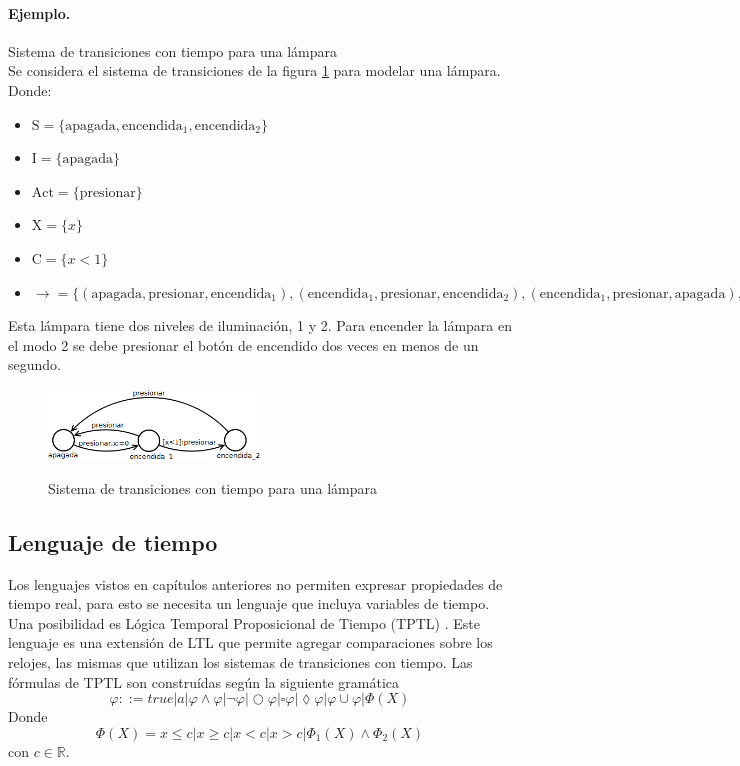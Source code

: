\paragraph{Ejemplo.} Sistema de transiciones con tiempo para una lámpara\\
Se considera el sistema de transiciones de la figura \ref{fig:lampara} para modelar una
 lámpara. Donde:
\begin{itemize}
\item $\text{S} = \{ \text{apagada}, \text{encendida}_1, \text{encendida}_2 \}$
\item $\text{I} = \{ \text{apagada} \}$
\item $\text{Act} = \{ \text{presionar} \}$
\item $\text{X} = \{ x \}$ 
\item $\text{C} = \{ x < 1 \}$
\item ${\to} = \{ (\text{apagada},\text{presionar},\text{encendida}_1), (\text{encendida}_1,\text{presionar},\text{encendida}_2), (\text{encendida}_1,\text{presionar},\text{apagada}), (\text{encendida}_2,\text{presionar},\text{apagada}) \}$
\end{itemize}

Esta lámpara tiene dos niveles de iluminación, 1 y 2. Para encender la lámpara en el
 modo 2 se debe presionar el botón de encendido dos veces en menos de un segundo.
 
\begin{figure}[hbtp]
\begin{center}
\caption{Sistema de transiciones con tiempo para una lámpara}
\includegraphics[width=0.5\textwidth]{mc/imagenes/tts.png}
\label{fig:lampara}
\end{center}
\end{figure}


\subsection{Lenguaje de tiempo}
Los lenguajes vistos en capítulos anteriores no permiten expresar propiedades de tiempo
 real, para esto se necesita un lenguaje que incluya variables de tiempo.
Una posibilidad es Lógica Temporal Proposicional de Tiempo (TPTL) \cite{alur}. Este lenguaje es una
 extensión de LTL que permite agregar comparaciones sobre los relojes, las mismas que
 utilizan los sistemas de transiciones con tiempo.
Las fórmulas de TPTL son construídas según la siguiente gramática
\[ \varphi ::= true | a | \varphi \wedge \varphi | \lnot \varphi | \bigcirc \varphi | \square \varphi | \lozenge \varphi | \varphi \cup \varphi | \Phi (X) \]
Donde
\[ \Phi (X) = x \leq c | x \geq c | x < c | x > c | \Phi_1 (X) \land \Phi_2 (X) \]
con $c \in \mathbb{R}$.

